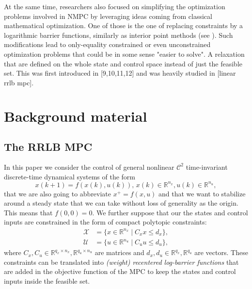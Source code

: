 \documentclass[conference]{IEEEtran}
\theoremstyle{definition}
\theoremstyle{remark}
\newcommand{\R}{\mathbb{R}}
\newcommand{\calC}{\mathcal{C}}
\newcommand{\ctwo}{\calC^2}
\begin{document}
At the same time, researchers also focused on simplifying the optimization problems involved in NMPC by leveraging ideas coming from classical mathematical optimization. 
One of those is the one of replacing constraints by a logarithmic barrier functions, similarly as interior point methods (see \cite*{interior-point-methods}).
Such modifications lead to only-equality constrained or even unconstrained optimization problems that could be in some sense "easier to solve".
A relaxation 
 that are defined on the whole state and control space instead of just the feasible set. This was first introduced in [9,10,11,12] and was heavily studied in [linear rrlb mpc].




\section{Background material}

\subsection{The RRLB MPC}

In this paper we consider the control of general nonlinear $\ctwo$ time-invariant discrete-time dynamical systems of the form 
\begin{equation}
	\label{eq:sys}
	x(k+1) = f(x(k),u(k)),\, x(k)\in\R^{n_x}, u(k)\in\R^{n_u},
\end{equation}
that we are also going to abbreviate $x^+ = f(x,u)$ and that we want to stabilize around a steady state that we can take without loss of generality as the origin. 
This means that $f(0,0) = 0$.
We further suppose that our the states and control inputs are constrained in the form of compact polytopic constraints:
\begin{equation}
	\label{eq:constr}
	\begin{aligned}
		\mathcal{X} &= \{x\in\R^{n_x} \mid C_x x \leq d_x \},\\
		\mathcal{U} &= \{u\in\R^{n_u} \mid C_u u \leq d_u\},
	\end{aligned}
\end{equation}
where $C_x, C_u \in \R^{q_x \times n_x}, \R^{q_u \times n_u}$ are matrices and $d_x, d_u \in \R^{q_x}, \R^{q_u}$ are vectors.
These constraints can be translated into \textit{(weight) recentered log-barrier functions} that are added in the objective function of the MPC to keep the states and control inputs inside the feasible set.
\end{document}
